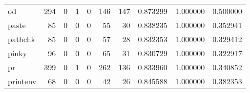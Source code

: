 \begin{tabular}{lrrrrrrrrr}
od        &                                   294 &                                                  0 &                                                  1 &                                                  0 &                                                146 &                                                147 &                                           0.873299 &                               1.000000 &                             0.500000 \\
paste     &                                    85 &                                                  0 &                                                  0 &                                                  0 &                                                 55 &                                                 30 &                                           0.838235 &                               1.000000 &                             0.352941 \\
pathchk   &                                    85 &                                                  0 &                                                  0 &                                                  0 &                                                 57 &                                                 28 &                                           0.832353 &                               1.000000 &                             0.329412 \\
pinky     &                                    96 &                                                  0 &                                                  0 &                                                  0 &                                                 65 &                                                 31 &                                           0.830729 &                               1.000000 &                             0.322917 \\
pr        &                                   399 &                                                  0 &                                                  1 &                                                  0 &                                                262 &                                                136 &                                           0.833960 &                               1.000000 &                             0.340852 \\
printenv  &                                    68 &                                                  0 &                                                  0 &                                                  0 &                                                 42 &                                                 26 &                                           0.845588 &                               1.000000 &                             0.382353 \\

\end{tabular}
